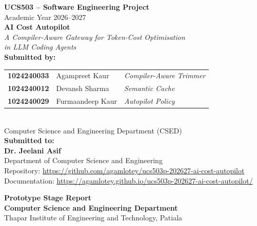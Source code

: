 \documentclass[12pt, a4paper, oneside]{report}
\begin{document}
\begin{titlepage}
    \centering
    \vspace*{0.5cm}

    {\Large\bfseries UCS503 -- Software Engineering Project}\\[0.3cm]
    {\large Academic Year 2026--2027}\\[1.5cm]

    {\Huge\bfseries AI Cost Autopilot}\\[0.4cm]
    {\large\textit{A Compiler-Aware Gateway for Token-Cost Optimisation\\in LLM Coding Agents}}\\[2.0cm]

    {\large\textbf{Submitted by:}}\\[0.3cm]
    \begin{tabular}{lll}
        \textbf{1024240033} & Agampreet Kaur   & \textit{Compiler-Aware Trimmer} \\
        \textbf{1024240012} & Devansh Sharma   & \textit{Semantic Cache} \\
        \textbf{1024240029} & Furmaandeep Kaur & \textit{Autopilot Policy} \\
    \end{tabular}\\[0.5cm]
    {\normalsize Computer Science and Engineering Department (CSED)}\\[1.2cm]

    {\large\textbf{Submitted to:}}\\[0.2cm]
    {\large\textbf{Dr. Jeelani Asif}}\\[0.1cm]
    {\normalsize Department of Computer Science and Engineering}\\[1.2cm]

    {\normalsize Repository: \url{https://github.com/agamlotey/ucs503p-202627-ai-cost-autopilot}}\\[0.15cm]
    {\normalsize Documentation: \url{https://agamlotey.github.io/ucs503p-202627-ai-cost-autopilot/}}

    \vfill
    {\normalsize\textbf{Prototype Stage Report}}\\[0.15cm]
    {\normalsize\textbf{Computer Science and Engineering Department}}\\[0.1cm]
    {\normalsize Thapar Institute of Engineering and Technology, Patiala}\\[0.4cm]
\end{titlepage}
\end{document}
